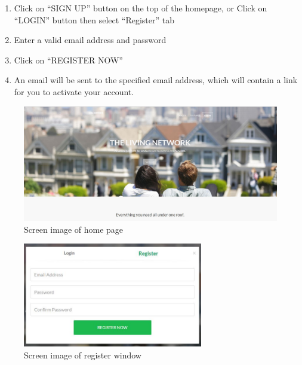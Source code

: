 \documentclass[12pt]{article}
\begin{document}
    \begin{enumerate}
        \item Click on ``SIGN UP'' button on the top of the homepage, or Click on ``LOGIN'' button then select ``Register'' tab
        \item Enter a valid email address and password
        \item Click on ``REGISTER NOW''
        \item An email will be sent to the specified email address, which will contain a link for you to activate your account.
    \end{enumerate}
    \begin{figure}
        \centering
        \includegraphics[width=\textwidth]{homepage}
        \caption{Screen image of home page}
        \label{fig:homepage}
    \end{figure}
    \begin{figure}
        \centering
        \includegraphics[width=0.7\textwidth]{register}
        \caption{Screen image of register window}
        \label{fig:register}
    \end{figure}
\end{document}
